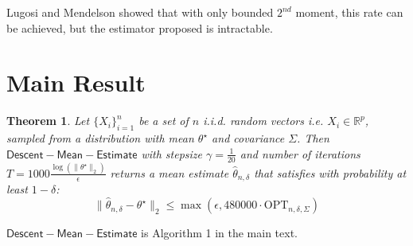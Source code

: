 \documentclass{article}
\newtheorem{theorem}{Theorem}[section]
\theoremstyle{remark}
\theoremstyle{defintiion}
\newcommand{\real}{\mathbb{R}}
\newcommand{\OPT}{\mathrm{OPT}}
\newcommand{\eparam}{\widehat{\theta}}
\newcommand{\tparam}{\theta^{\star}}
\begin{document}
Lugosi and Mendelson showed that with only bounded \(2^{nd}\) moment, this rate can be achieved, but the estimator proposed is intractable.

\section{Main Result}
\begin{theorem}
Let \(\{X_{i}\}_{i=1}^{n}\) be a set of \(n\) i.i.d. random vectors i.e. \(X_{i} \in \real^{p}\), sampled from a distribution with mean \(\tparam\) and covariance \(\Sigma\). Then \(\mathsf{Descent-Mean-Estimate}\) with stepsize \(\gamma = \frac{1}{20}\) and number of iterations \(T = 1000\frac{\log(\|\tparam\|_{2})}{\epsilon}\) returns a mean estimate \(\eparam_{n, \delta}\) that satisfies with probability at least \(1 - \delta\):
\begin{equation*}
\|\eparam_{n, \delta} - \tparam\|_{2} \leq \max\left(\epsilon, 480000 \cdot \OPT_{n, \delta, \Sigma}\right)
\end{equation*}
\end{theorem}

\(\mathsf{Descent-Mean-Estimate}\) is Algorithm 1 in the main text.
\end{document}
